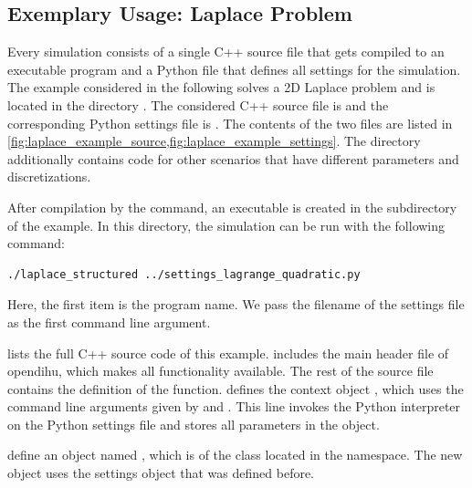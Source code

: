 \subsection{Exemplary Usage: Laplace Problem}\label{sec:exemplary_usage_1}
Every simulation consists of a single C++ source file that gets compiled to an executable program and a Python file that defines all settings for the simulation. The example considered in the following solves a 2D Laplace problem and is located in the directory . The considered C++ source file is  and the corresponding Python settings file is . The contents of the two files are listed in \cref{fig:laplace_example_source,fig:laplace_example_settings}. The directory additionally contains code for other scenarios that have different parameters and discretizations.

After compilation by the  command, an executable is created in the  subdirectory of the example. In this directory, the simulation can be run with the following command:
\begin{lstlisting}[columns=fullflexible,breaklines=true,postbreak=\mbox{\textcolor{gray}{$\hookrightarrow$}\space}]
  ./laplace_structured ../settings_lagrange_quadratic.py
\end{lstlisting}
Here, the first item is the program name. We pass the filename of the settings file as the first command line argument. 

 lists the full C++ source code of this example.  includes the main header file of opendihu, which makes all functionality available. The rest of the source file contains the definition of the  function.  defines the context object , which uses the command line arguments given by  and . This line invokes the Python interpreter on the Python settings file and stores all parameters in the  object.

 define an object named , which is of the  class located in the  namespace. The new object uses the settings object that was defined before.

